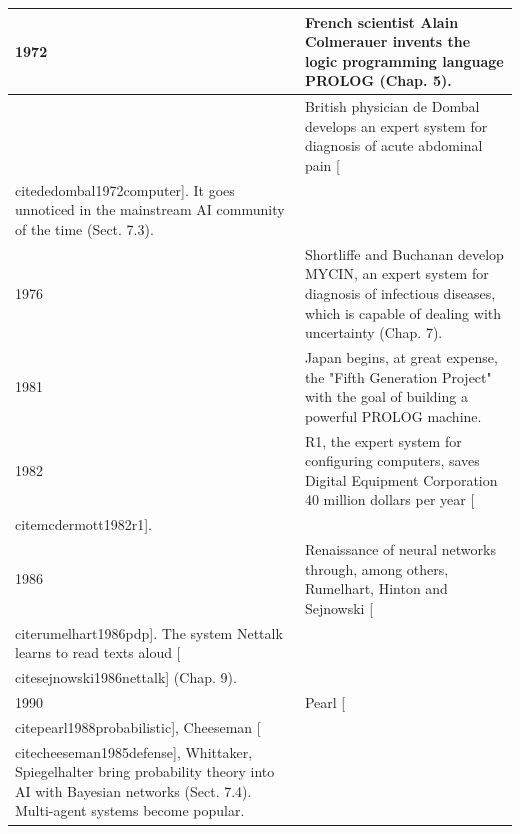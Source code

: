 \documentclass[10pt]{book}
\begin{document}
\begin{table}[htbp]
\begin{center}
\begin{tabular}{|l|l|}
\hline
1972 & French scientist Alain Colmerauer invents the logic programming language PROLOG (Chap. 5). \\
\hline
 & British physician de Dombal develops an expert system for diagnosis of acute abdominal pain [\\cite{dedombal1972computer}]. It goes unnoticed in the mainstream AI community of the time (Sect. 7.3). \\
\hline
1976 & Shortliffe and Buchanan develop MYCIN, an expert system for diagnosis of infectious diseases, which is capable of dealing with uncertainty (Chap. 7). \\
\hline
1981 & Japan begins, at great expense, the "Fifth Generation Project" with the goal of building a powerful PROLOG machine. \\
\hline
1982 & R1, the expert system for configuring computers, saves Digital Equipment Corporation 40 million dollars per year [\\cite{mcdermott1982r1}]. \\
\hline
1986 & Renaissance of neural networks through, among others, Rumelhart, Hinton and Sejnowski [\\cite{rumelhart1986pdp}]. The system Nettalk learns to read texts aloud [\\cite{sejnowski1986nettalk}] (Chap. 9). \\
\hline
1990 & Pearl [\\cite{pearl1988probabilistic}], Cheeseman [\\cite{cheeseman1985defense}], Whittaker, Spiegelhalter bring probability theory into AI with Bayesian networks (Sect. 7.4). Multi-agent systems become popular. \\
\hline
\end{tabular}
\end{center}
\end{table}
\end{document}
